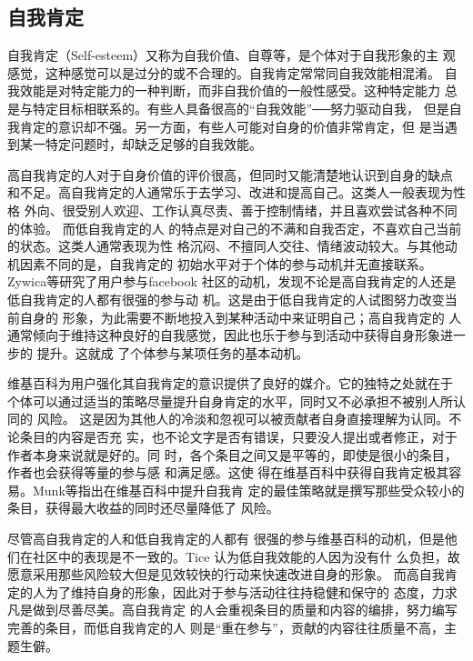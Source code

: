 \subsection{自我肯定}
\label{sec:self-esteem}

自我肯定（Self-esteem）又称为自我价值、自尊等，是个体对于自我形象的主
观感觉，这种感觉可以是过分的或不合理的\cite{weiten2008psychology}。自我肯定常常同自我效能相混淆。
自我效能是对特定能力的一种判断，而非自我价值的一般性感受。这种特定能力
总是与特定目标相联系的。有些人具备很高的“自我效能”──努力驱动自我，
但是自我肯定的意识却不强。另一方面，有些人可能对自身的价值非常肯定，但
是当遇到某一特定问题时，却缺乏足够的自我效能。

高自我肯定的人对于自身价值的评价很高，但同时又能清楚地认识到自身的缺点
和不足。高自我肯定的人通常乐于去学习、改进和提高自己。这类人一般表现为性格
外向、很受别人欢迎、工作认真尽责、善于控制情绪，并且喜欢尝试各种不同的体验。
而低自我肯定的人
的特点是对自己的不满和自我否定，不喜欢自己当前的状态。这类人通常表现为性
格沉闷、不擅同人交往、情绪波动较大。与其他动机因素不同的是，自我肯定的
初始水平对于个体的参与动机并无直接联系。Zywica等研究了用户参与facebook
社区的动机，发现不论是高自我肯定的人还是低自我肯定的人都有很强的参与动
机\cite{zywica2008faces}。这是由于低自我肯定的人试图努力改变当前自身的
形象，为此需要不断地投入到某种活动中来证明自己；高自我肯定的
人通常倾向于维持这种良好的自我感觉，因此也乐于参与到活动中获得自身形象进一步的
提升。这就成
了个体参与某项任务的基本动机。

维基百科为用户强化其自我肯定的意识提供了良好的媒介。它的独特之处就在于
个体可以通过适当的策略尽量提升自身肯定的水平，同时又不必承担不被别人所认同的
风险。
这是因为其他人的冷淡和忽视可以被贡献者自身直接理解为认同。不论条目的内容是否充
实，也不论文字是否有错误，只要没人提出或者修正，对于作者本身来说就是好的。同
时，各个条目之间又是平等的，即使是很小的条目，作者也会获得等量的参与感
和满足感。这使
得在维基百科中获得自我肯定极其容易。Munk等指出在维基百科中提升自我肯
定的最佳策略就是撰写那些受众较小的条目，获得最大收益的同时还尽量降低了
风险\cite{munk2009self}。

尽管高自我肯定的人和低自我肯定的人都有
很强的参与维基百科的动机，但是他们在社区中的表现是不一致的。Tice 认为低自我效能的人因为没有什
么负担，故愿意采用那些风险较大但是见效较快的行动来快速改进自身的形象\cite{tice1993social}。
而高自我肯定的人为了维持自身的形象，因此对于参与活动往往持稳健和保守的
态度，力求凡是做到尽善尽美。高自我肯定
的人会重视条目的质量和内容的编排，努力编写完善的条目，而低自我肯定的人
则是“重在参与”，贡献的内容往往质量不高，主题生僻。

